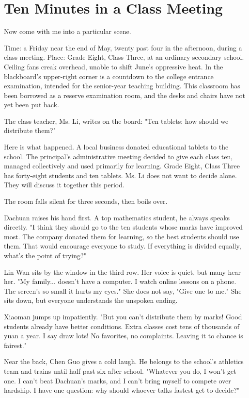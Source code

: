 \section{Ten Minutes in a Class Meeting}
Now come with me into a particular scene.

Time: a Friday near the end of May, twenty past four in the afternoon, during a class meeting. Place: Grade Eight, Class Three, at an ordinary secondary school. Ceiling fans creak overhead, unable to shift June's oppressive heat. In the blackboard's upper-right corner is a countdown to the college entrance examination, intended for the senior-year teaching building. This classroom has been borrowed as a reserve examination room, and the desks and chairs have not yet been put back.

The class teacher, Ms. Li, writes on the board: "Ten tablets: how should we distribute them?"

Here is what happened. A local business donated educational tablets to the school. The principal's administrative meeting decided to give each class ten, managed collectively and used primarily for learning. Grade Eight, Class Three has forty-eight students and ten tablets. Ms. Li does not want to decide alone. They will discuss it together this period.

The room falls silent for three seconds, then boils over.

Dachuan raises his hand first. A top mathematics student, he always speaks directly. "I think they should go to the ten students whose marks have improved most. The company donated them for learning, so the best students should use them. That would encourage everyone to study. If everything is divided equally, what's the point of trying?"

Lin Wan sits by the window in the third row. Her voice is quiet, but many hear her. "My family... doesn't have a computer. I watch online lessons on a phone. The screen's so small it hurts my eyes." She does not say, "Give one to me." She sits down, but everyone understands the unspoken ending.

Xiaoman jumps up impatiently. "But you can't distribute them by marks! Good students already have better conditions. Extra classes cost tens of thousands of yuan a year. I say draw lots! No favorites, no complaints. Leaving it to chance is fairest."

Near the back, Chen Guo gives a cold laugh. He belongs to the school's athletics team and trains until half past six after school. "Whatever you do, I won't get one. I can't beat Dachuan's marks, and I can't bring myself to compete over hardship. I have one question: why should whoever talks fastest get to decide?"


